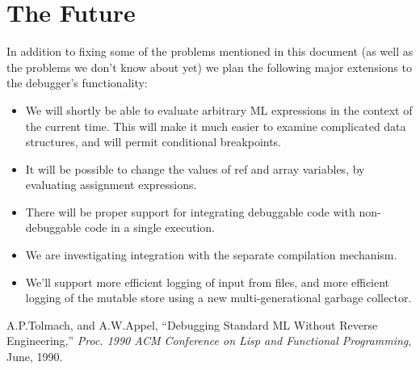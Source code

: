 \section{The Future}
In addition to fixing some of the problems mentioned in this document
(as well as the problems we don't know about yet) we plan the following
major extensions to the debugger's functionality:
\begin{itemize}
  \item We will shortly be able to evaluate arbitrary ML expressions
in the context of the current time.  This will make it much easier to examine
complicated data structures, and will permit conditional breakpoints. 
  \item It will be possible to change the values of ref and array variables, 
by evaluating assignment expressions.
  \item There will be proper support for integrating debuggable code with 
non-debuggable code in a single execution.
  \item We are investigating integration with the separate compilation 
mechanism.
  \item We'll support more efficient logging of input from files, and more
efficient logging of the mutable store using a new multi-generational garbage
collector.
\end{itemize}

\begin{thebibliography}{9}
 A.P.Tolmach, and A.W.Appel, ``Debugging Standard ML Without
Reverse Engineering,'' {\em Proc. 1990 ACM Conference on Lisp and Functional
Programming}, June, 1990.
\end{thebibliography}




